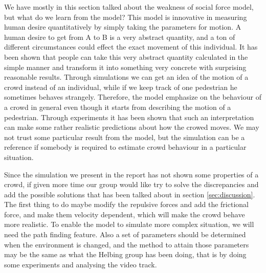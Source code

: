 We have mostly in this section talked about the weakness of social force 
model, but what do we learn from the model? This model is innovative in 
measuring human desire quantitatively by simply taking the parameters for motion. 
A human desire to get from A to B is a very abstract quantity, and a ton of
different circumstances could effect the exact movement of this
individual. It has been shown that people can take this very abstract quantity 
calculated in the simple manner and transform it into something very 
concrete with surprising reasonable results.
Through simulations we can get an idea of the motion of a crowd instead of an 
individual, while if we keep track of one pedestrian he sometimes behaves strangely. 
Therefore, the model emphasize on the behaviour of a crowd in general even though 
it starts from describing the motion of a pedestrian. Through experiments 
it has been shown that such an interpretation can make some rather realistic 
predictions about how the crowed moves. We may not trust some particular result from 
the model, but the simulation can be a reference if somebody is required to estimate 
crowd behaviour in a particular situation.

Since the simulation we present in the report has not shown some properties of a 
crowd, if given more time our group would like try to solve the discrepancies and add the 
possible solutions that has been talked about in section \ref{sec:discussion}. The first thing to do 
maybe modify the repulsive forces and add the frictional force, and make them 
velocity dependent, which will make the crowd behave more realistic. 
To enable the model to simulate more complex situation, we will need the path 
finding feature. Also a set of parameters should be determined when the environment is 
changed, and the method to attain those parameters may be the same as what the 
Helbing group has been doing, that is by doing some experiments and analysing the 
 video track.